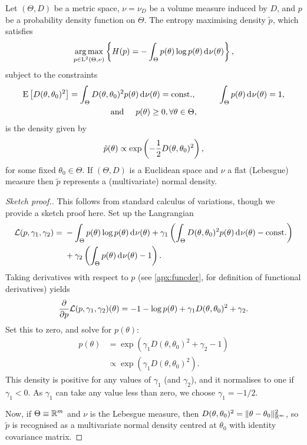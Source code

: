 \begin{lemma}\label{thm:maxentr}
  Let $(\Theta,D)$ be a metric space, $\nu=\nu_D$ be a volume measure induced by $D$, and $p$ be a probability density function on $\Theta$.
  The entropy maximising density $\tilde p$, which satisfies
  \[
    \operatorname*{arg\,max}_{p\in\text{L}^2(\Theta,\nu)} 
    \left\{ H(p) = - \int_\Theta  p(\theta) \log  p(\theta) \operatorname{d}\hspace{0.5pt}\!\nu(\theta) \right\},
  \]
  subject to the constraints
  \begin{align*}
    \begin{gathered}
      \operatorname{E}\big[D(\theta,\theta_0)^2\big] = \int_\Theta D(\theta,\theta_0)^2 p(\theta) \operatorname{d}\hspace{0.5pt}\! \nu(\theta) = \text{const.}\hspace{0.01em}, \hspace{1cm} 
      \int_\Theta p(\theta) \operatorname{d}\hspace{0.5pt}\! \nu(\theta) = 1, \\
      \text{and} \hspace{0.5cm} p(\theta) \geq 0, \forall \theta \in \Theta,
    \end{gathered}
  \end{align*}
  is the density given by
  \[
    \tilde p(\theta) \propto \exp \left(-\frac{1}{2} D(\theta,\theta_0)^2 \right),
  \]
  for some fixed $\theta_0\in\Theta$.
  If $(\Theta,D)$ is a Euclidean space and $\nu$ a flat (Lebesgue) measure then $\tilde p$ represents a (multivariate) normal density.
\end{lemma}

\begin{proof}[Sketch proof.]
  This follows from standard calculus of variations, though we provide a sketch proof here.
  Set up the Langrangian
  \begin{align*}
      {\mathcal L}(p,\gamma_1,\gamma_2) 
      ={}& 
      - \int_\Theta p(\theta) \log p(\theta) \operatorname{d}\hspace{0.5pt}\!\nu(\theta) +
      \gamma_1 \left(\int_\Theta D(\theta,\theta_0)^2 p(\theta) \operatorname{d}\hspace{0.5pt}\!\nu(\theta) - \text{const.}\hspace{0.01em} \right) \\
      &+ \gamma_2 \left( \int_\Theta p(\theta) \operatorname{d}\hspace{0.5pt}\!\nu(\theta) - 1 \right).
  \end{align*}
  Taking derivatives with respect to $p$ (see \cref{apx:funcder},  for definition of functional derivatives) yields
  \begin{align*}
    \frac{\partial}{\partial p} {\mathcal L}(p,\gamma_1,\gamma_2)(\theta)
    = - 1 - \log p(\theta) + \gamma_1 D(\theta,\theta_0)^2 + \gamma_2.
  \end{align*}
  Set this to zero, and solve for $p(\theta)$:
  \begin{align*}
    p(\theta) &= \exp \left( \gamma_1 D(\theta,\theta_0)^2 + \gamma_2 - 1 \right) \\
    &\propto \exp \left( \gamma_1 D(\theta,\theta_0)^2 \right).
  \end{align*}
  This density is positive for any values of $\gamma_1$ (and $\gamma_2$), and it normalises to one if $\gamma_1 < 0$. 
  As $\gamma_1$ can take any value less than zero, we choose $\gamma_1=-1/2$.
  
  Now, if $\Theta \equiv \mathbb{R}^m$ and $\nu$ is the Lebesgue measure, then $D(\theta,\theta_0)^2 = \lVert\theta-\theta_0\rVert_{\mathbb{R}^m}^2$, so $\tilde p$ is recognised as a multivariate normal density centred at $\theta_0$ with identity covariance matrix.
\end{proof}

